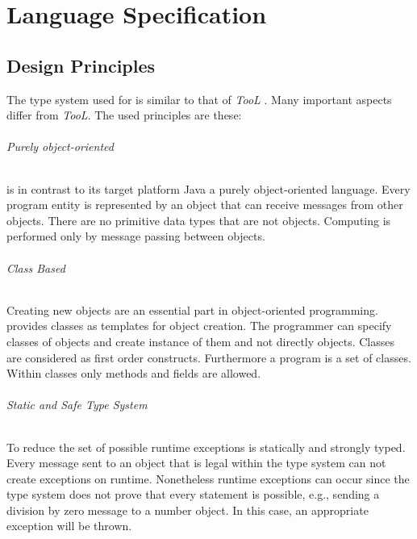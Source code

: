 \part{Language Specification}
\chapter{Design Principles}
The type system used for \ooplss is similar to that of \emph{TooL}
\cite{gawecki_tool:_1995}. Many important aspects differ from
\emph{TooL}. The used principles are these:

\paragraph{Purely object-oriented}
\ooplss is in contrast to its target platform Java a purely
object-oriented language. Every program entity is represented by an
object that can receive messages from other objects. There are no
primitive data types that are not objects. Computing is performed only
by message passing between objects.

\paragraph{Class Based}
Creating new objects are an essential part in object-oriented
programming. \ooplss provides classes as templates for object
creation. The programmer can specify classes of objects and create
instance of them and not directly objects. Classes are considered as
first order constructs. Furthermore a program is a set of classes. Within
classes only methods and fields are allowed.

\paragraph{Static and Safe Type System}
To reduce the set of possible runtime exceptions \ooplss is statically
and strongly typed. Every message sent to an object that is legal within
the type system can not create exceptions on runtime. Nonetheless runtime
exceptions can occur since the type system does not prove that every
statement is possible, e.g., sending a division by zero message to a
number object.  In this case, an appropriate exception will be thrown.

